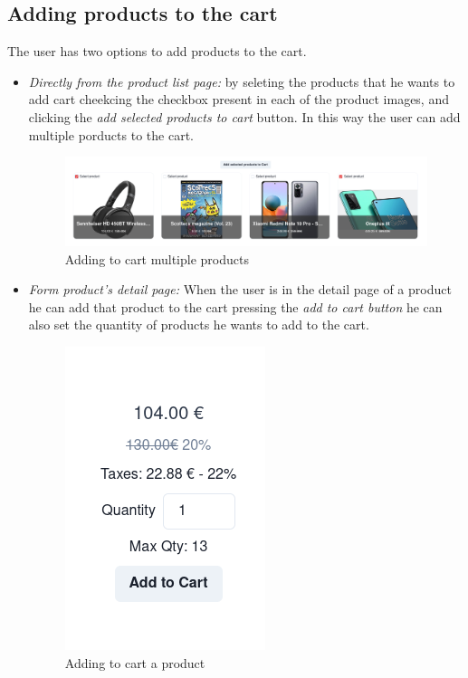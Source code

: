 \subsection{Adding products to the cart}
The user has two options to add products to the cart.
\begin{itemize}
    \item \textit{Directly from the product list page:} by seleting the products that he wants to add cart cheekcing the checkbox present in each of the product images, and clicking the \textit{add selected products to cart} button. In this way the user can add multiple porducts to the cart.
          \begin{figure}[!ht]
              \caption{Adding to cart multiple products}
              \vspace{10px}
              \includegraphics[scale=0.25]{../../../../Images/userManual/addtoCartPLP.png}
              \centering
          \end{figure}
    \item \textit{Form product's detail page:} When the user is in the detail page of a product he can add that product to the cart pressing the \textit{add to cart button} he can also set the quantity of products he wants to add to the cart.
          \begin{figure}[!ht]
              \caption{Adding to cart a product}
              \vspace{10px}
              \includegraphics[scale=0.5]{../../../../Images/userManual/addToCartPDP.png}
              \centering
          \end{figure}
\end{itemize}

